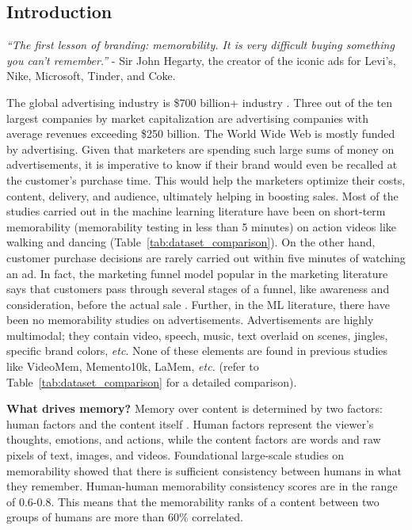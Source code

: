 \subsection{Introduction}
\label{sec:introduction}
\textit{``The first lesson of branding: memorability. It is very difficult buying something you can't remember.''} - Sir John Hegarty, the creator of the iconic ads for Levi's, Nike, Microsoft, Tinder, and Coke.


The global advertising industry is \$700 billion+ industry \cite{forbes2021}. Three out of the ten largest companies by market capitalization are advertising companies with average revenues exceeding \$250 billion. The World Wide Web is mostly funded by advertising. Given that marketers are spending such large sums of money on advertisements, it is imperative to know if their brand would even be recalled at the customer's purchase time. This would help the marketers optimize their costs, content, delivery, and audience, ultimately helping in boosting sales. Most of the studies carried out in the machine learning literature have been on short-term memorability (memorability testing in less than 5 minutes) on action videos like walking and dancing (Table~\ref{tab:dataset_comparison}). On the other hand, customer purchase decisions are rarely carried out within five minutes of watching an ad. In fact, the marketing funnel model popular in the marketing literature says that customers pass through several stages of a funnel, like awareness and consideration, before the actual sale \cite{lavidge1961model}. Further, in the ML literature, there have been no memorability studies on advertisements. Advertisements are highly multimodal; they contain video, speech, music, text overlaid on scenes, jingles, specific brand colors, \textit{etc}. None of these elements are found in previous studies like VideoMem, Memento10k, LaMem, \textit{etc.} (refer to Table~\ref{tab:dataset_comparison} for a detailed comparison). 











\noindent \textbf{What drives memory?} Memory over content is determined by two factors: human factors and the content itself \cite{bylinskii2015intrinsic}. Human factors represent the viewer's thoughts, emotions, and actions, while the content factors are words and raw pixels of text, images, and videos. Foundational large-scale studies on memorability \cite{isola2011makes,khosla2015understanding,cohendet2019videomem,akagunduz2019defining} showed that there is sufficient consistency between humans in what they remember. Human-human memorability consistency scores are in the range of 0.6-0.8. This means that the memorability ranks of a content between two groups of humans are more than 60\% correlated. 




